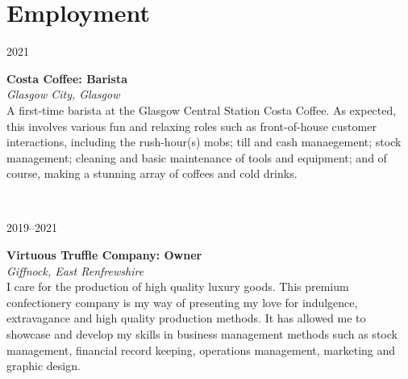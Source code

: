 \documentclass[11pt, english]{article}
\begin{document}
{\section{Employment}

\begin{minipage}[t]{.15\linewidth}
	\hfill
	\textsc{2021}
\end{minipage}
\hfill\vline\hfill
\begin{minipage}[t]{.80\linewidth}
	\textbf{Costa Coffee: Barista}\\
	\textit{Glasgow City, Glasgow}\\
	A first-time barista at the Glasgow Central Station Costa Coffee. As expected, this involves various fun and relaxing roles such as front-of-house customer interactions, including the rush-hour(s) mobs; till and cash manaegement; stock management; cleaning and basic maintenance of tools and equipment; and of course, making a stunning array of coffees and cold drinks.
\end{minipage}\\
\vspace{0.25cm}

\begin{minipage}[t]{.15\linewidth}
        \hfill 
        \textsc{2019--2021}
\end{minipage}
\hfill\vline\hfill
\begin{minipage}[t]{.80\linewidth}
        \textbf{Virtuous Truffle Company: Owner}\\
	\textit{Giffnock, East Renfrewshire}\\ 
	I care for the production of high quality luxury goods. This premium confectionery company is my way of presenting my love for indulgence, extravagance and high quality production methods. It has allowed me to showcase and develop my skills in business management methods such as stock management, financial record keeping, operations management, marketing and graphic design.
\end{minipage}\\
\vspace{0.25cm}

}
\end{document}
